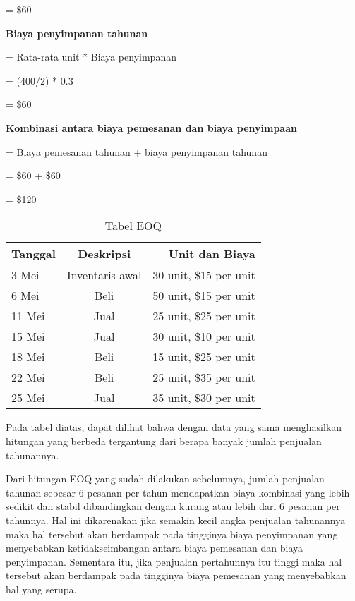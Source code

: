 = \${60}

\textbf{Biaya penyimpanan tahunan}

= Rata-rata unit * Biaya penyimpanan

= (400/2) * 0.3

= \${60}

\textbf{Kombinasi antara biaya pemesanan dan biaya penyimpaan}

= Biaya pemesanan tahunan + biaya penyimpanan tahunan

= \${60} + \${60}

= \${120}

\begin{table}[h!]
	\begin{center}
	  \caption{Tabel EOQ}
	  \label{tab:table4}
	  \begin{tabular}{l|c|r} %
		\textbf{Tanggal} & \textbf{Deskripsi} & \textbf{Unit dan Biaya} \\
		\hline
		3 Mei & Inventaris awal & 30 unit, \${15} per unit\\
		6 Mei & Beli &  50 unit, \${15} per unit\\
		11 Mei & Jual &  25 unit, \${25} per unit\\
		15 Mei & Jual &  30 unit, \${10} per unit\\
		18 Mei & Beli &  15 unit, \${25} per unit\\
		22 Mei & Beli &  25 unit, \${35} per unit\\
		25 Mei & Jual &  35 unit, \${30} per unit\\
	  \end{tabular}
	\end{center}
  \end{table}

Pada tabel diatas, dapat dilihat bahwa dengan data yang sama menghasilkan hitungan yang berbeda tergantung dari berapa banyak jumlah penjualan tahunannya.

Dari hitungan EOQ yang sudah dilakukan sebelumnya, jumlah penjualan tahunan sebesar 6 pesanan per tahun mendapatkan biaya kombinasi yang lebih sedikit dan stabil dibandingkan dengan kurang atau lebih dari 6 pesanan per tahunnya. Hal ini dikarenakan jika semakin kecil angka penjualan tahunannya maka hal tersebut akan berdampak pada tingginya biaya penyimpanan yang menyebabkan ketidakseimbangan antara biaya pemesanan dan biaya penyimpanan. Sementara itu, jika penjualan pertahunnya itu tinggi maka hal tersebut akan berdampak pada tingginya biaya pemesanan yang menyebabkan hal yang serupa.

